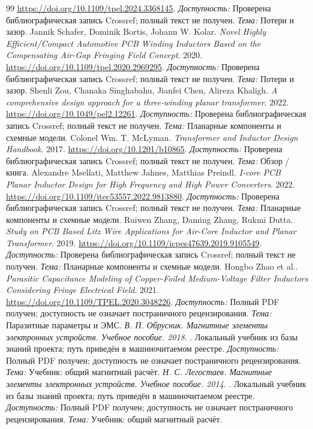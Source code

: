 \documentclass[14pt,a4paper]{extarticle}
\begin{document}
\begin{thebibliography}{99}
\url{https://doi.org/10.1109/tpel.2024.3368145}.
\textit{Доступность:} Проверена библиографическая запись Crossref; полный текст не получен. \textit{Тема:} Потери и зазор.
Jannik Schafer, Dominik Bortis, Johann W. Kolar. \textit{Novel Highly Efficient/Compact Automotive PCB Winding Inductors Based on the Compensating Air-Gap Fringing Field Concept}. 2020.
\url{https://doi.org/10.1109/tpel.2020.2969295}.
\textit{Доступность:} Проверена библиографическая запись Crossref; полный текст не получен. \textit{Тема:} Потери и зазор.
Shenli Zou, Chanaka Singhabahu, Jianfei Chen, Alireza Khaligh. \textit{A comprehensive design approach for a three‐winding planar transformer}. 2022.
\url{https://doi.org/10.1049/pel2.12261}.
\textit{Доступность:} Проверена библиографическая запись Crossref; полный текст не получен. \textit{Тема:} Планарные компоненты и схемные модели.
Colonel Wm. T. McLyman. \textit{Transformer and Inductor Design Handbook}. 2017.
\url{https://doi.org/10.1201/b10865}.
\textit{Доступность:} Проверена библиографическая запись Crossref; полный текст не получен. \textit{Тема:} Обзор / книга.
Alexandre Msellati, Matthew Jahnes, Matthias Preindl. \textit{I-core PCB Planar Inductor Design for High Frequency and High Power Converters}. 2022.
\url{https://doi.org/10.1109/itec53557.2022.9813880}.
\textit{Доступность:} Проверена библиографическая запись Crossref; полный текст не получен. \textit{Тема:} Планарные компоненты и схемные модели.
Ruiwen Zhang, Daming Zhang, Rukmi Dutta. \textit{Study on PCB Based Litz Wire Applications for Air-Core Inductor and Planar Transformer}. 2019.
\url{https://doi.org/10.1109/icpes47639.2019.9105549}.
\textit{Доступность:} Проверена библиографическая запись Crossref; полный текст не получен. \textit{Тема:} Планарные компоненты и схемные модели.
Hongbo Zhao et al.. \textit{Parasitic Capacitance Modeling of Copper-Foiled Medium-Voltage Filter Inductors Considering Fringe Electrical Field}. 2021.
\url{https://doi.org/10.1109/TPEL.2020.3048226}.
\textit{Доступность:} Полный PDF получен; доступность не означает постраничного рецензирования. \textit{Тема:} Паразитные параметры и ЭМС.
\textit{В. П. Обрусник. Магнитные элементы электронных устройств. Учебное пособие. 2018}. .
Локальный учебник из базы знаний проекта; путь приведён в машиночитаемом реестре.
\textit{Доступность:} Полный PDF получен; доступность не означает постраничного рецензирования. \textit{Тема:} Учебник: общий магнитный расчёт.
\textit{Н. С. Легостаев. Магнитные элементы электронных устройств. Учебное пособие. 2014}. .
Локальный учебник из базы знаний проекта; путь приведён в машиночитаемом реестре.
\textit{Доступность:} Полный PDF получен; доступность не означает постраничного рецензирования. \textit{Тема:} Учебник: общий магнитный расчёт.
\end{thebibliography}
\end{document}
